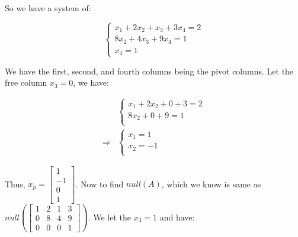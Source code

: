 \documentclass[11pt]{article}
\providecommand{\qbm}[1]{\begin{bmatrix} #1 \end{bmatrix}}
\begin{document}

So we have a system of:

\begin{equation*}
    \begin{cases}
        x_1 + 2x_2 + x_3 + 3x_4= 2 \\
        8x_2 + 4 x_3 + 9 x_4 = 1 \\
        x_4 = 1
    \end{cases}
\end{equation*}

We have the first, second, and fourth columns being the pivot columns. Let the free column $x_3 = 0$, we have:

\begin{align*}
    &\begin{cases}
        x_1 + 2x_2 + 0 + 3 = 2 \\
        8x_2 + 0 + 9 = 1 \\
    \end{cases} \\
    \Longrightarrow &\begin{cases}
        x_1 = 1 \\
        x_2 = -1 \\
    \end{cases}
\end{align*}

Thus, $x_p = \qbm{1 \\ -1 \\ 0 \\ 1}$. Now to find $null(A)$, which we know is same as $ null(\qbm{1 & 2 & 1 & 3  \\
    0 & 8 & 4 & 9  \\
    0 & 0 & 0 & 1 })$. We let the $x_3 = 1$ and have:
\end{document}
